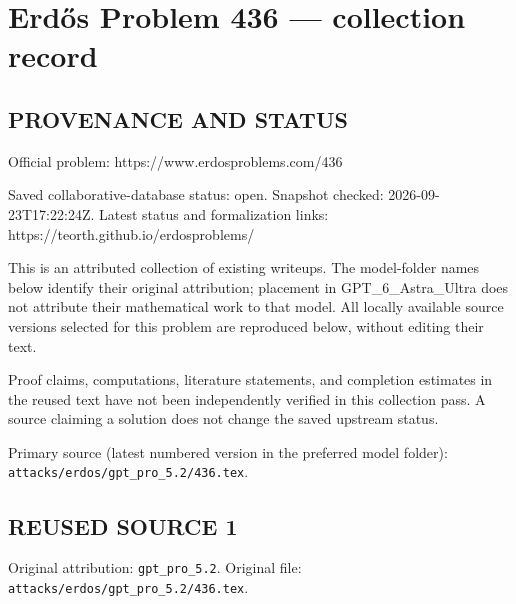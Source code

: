 \section*{Erd\H{o}s Problem 436 --- collection record}

\subsection*{PROVENANCE AND STATUS}
Official problem: https://www.erdosproblems.com/436

Saved collaborative-database status: open.
Snapshot checked: 2026-09-23T17:22:24Z.
Latest status and formalization links: https://teorth.github.io/erdosproblems/

This is an attributed collection of existing writeups. The model-folder names below identify their original attribution; placement in GPT\_6\_Astra\_Ultra does not attribute their mathematical work to that model. All locally available source versions selected for this problem are reproduced below, without editing their text.

Proof claims, computations, literature statements, and completion estimates in the reused text have not been independently verified in this collection pass. A source claiming a solution does not change the saved upstream status.

Primary source (latest numbered version in the preferred model folder): \texttt{attacks/erdos/gpt\_pro\_5.2/436.tex}.

\subsection*{REUSED SOURCE 1}
Original attribution: \texttt{gpt\_pro\_5.2}.
Original file: \texttt{attacks/erdos/gpt\_pro\_5.2/436.tex}.


